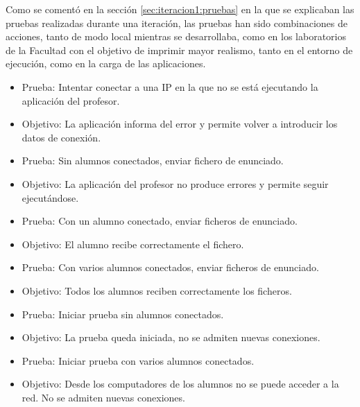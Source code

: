 Como se comentó en la sección \ref{sec:iteracion1:pruebas} en la que se explicaban las pruebas realizadas durante una iteración, las pruebas han sido combinaciones de acciones, tanto de modo local mientras se desarrollaba, como en los laboratorios de la Facultad con el objetivo de imprimir mayor realismo, tanto en el entorno de ejecución, como en la carga de las aplicaciones.
\newline



\begin{itemize}

    \item Prueba: Intentar conectar a una IP en la que no se está ejecutando la aplicación del profesor.
    \item Objetivo: La aplicación informa del error y permite volver a introducir los datos de conexión.
    \newline

    \item Prueba: Sin alumnos conectados, enviar fichero de enunciado.
    \item Objetivo: La aplicación del profesor no produce errores y permite seguir ejecutándose.
    \newline

    \item Prueba: Con un alumno conectado, enviar ficheros de enunciado.
    \item Objetivo: El alumno recibe correctamente el fichero.
    \newline

    \item Prueba: Con varios alumnos conectados, enviar ficheros de enunciado.
    \item Objetivo: Todos los alumnos reciben correctamente los ficheros.
    \newline

    \item Prueba: Iniciar prueba sin alumnos conectados.
    \item Objetivo: La prueba queda iniciada, no se admiten nuevas conexiones.
    \newline

    \item Prueba: Iniciar prueba con varios alumnos conectados.
    \item Objetivo: Desde los computadores de los alumnos no se puede acceder a la red. No se admiten nuevas conexiones.
    \newline



\end{itemize}
